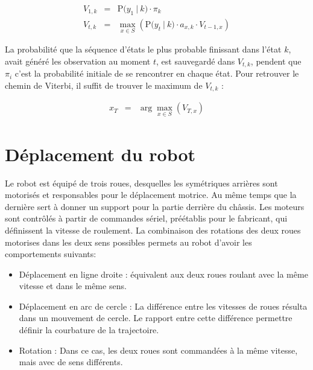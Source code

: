 \begin{equation*}
  \begin{array}{rcl}
    V_{1,k} &=& \mathrm{P}\big( y_1 \ | \ k \big) \cdot \pi_k \\
    V_{t,k} &=& \max_{x \in S} \left(  \mathrm{P}\big( y_t \ | \ k \big) \cdot a_{x,k} \cdot V_{t-1,x}\right)
  \end{array}
\end{equation*}

La probabilité que la séquence d'états le plus probable finissant dans l'état $k$, avait généré les observation au moment $t$, est sauvegardé dans $V_{t,k}$, pendent que $\pi_i$ c'est la probabilité initiale de se rencontrer en chaque état. Pour retrouver le chemin de Viterbi, il suffit de trouver le maximum de $V_{t,k}$ :

\begin{equation*}
  \begin{array}{rcl}
    x_T &=& \arg\max_{x \in S} (V_{T,x})
  \end{array}
\end{equation*}

\section{Déplacement du robot}

Le robot est équipé de trois roues, desquelles les symétriques
arrières sont motorisés et responsables pour le déplacement
motrice. Au même temps que la dernière sert à donner un support pour
la partie derrière du châssis. Les moteurs sont contrôlés à
partir de commandes sériel, préétablis pour le fabricant, qui
définissent la vitesse de roulement. La combinaison des rotations
des deux roues motorises dans les deux sens possibles permets au
robot d'avoir les comportements suivants:

\begin {itemize}
\item Déplacement en ligne droite : équivalent aux deux roues roulant
  avec la même vitesse et dans le même sens.

\item Déplacement en arc de cercle : La différence entre les vitesses
  de roues résulta dans un mouvement de cercle. Le rapport entre cette
  différence permettre définir la courbature de la trajectoire.

\item Rotation : Dans ce cas, les deux roues sont commandées à la même
  vitesse, mais avec de sens différents.
\end{itemize}

